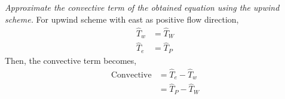 \section{}
\textit{Approximate the convective term of the obtained equation using
the upwind scheme.}
For upwind scheme with east as positive flow direction,
\begin{align*}
    \hat{T}_w &= \hat{T}_W \\
    \hat{T}_e &= \hat{T}_P 
\end{align*}
Then, the convective term becomes,
\begin{align*}
    \text{Convective} &= \hat{T}_e - \hat{T}_w \\
    &= \boxed{\hat{T}_P - \hat{T}_W}
\end{align*}